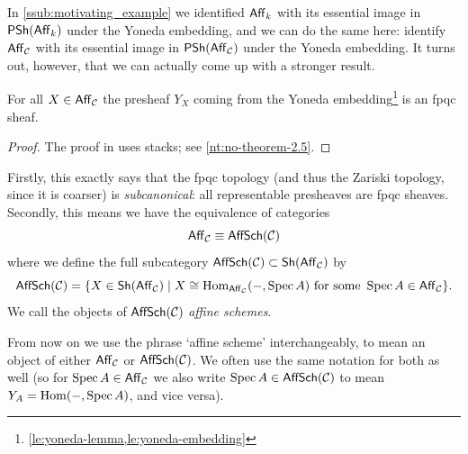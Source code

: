        In \cref{ssub:motivating_example} we identified $\mathsf{Aff}_{k}$ with its essential image in $\mathsf{PSh}(\mathsf{Aff}_{k})$ under the Yoneda embedding, and we can do the same here: identify $\mathsf{Aff}_{\mathcal{C}}$ with its essential image in $\mathsf{PSh}(\mathsf{Aff}_{\mathcal{C}})$ under the Yoneda embedding.
        It turns out, however, that we can actually come up with a stronger result.

        \begin{lemma}\label{le:essential-image-is-fpqc}
            For all $X\in\mathsf{Aff}_{\mathcal{C}}$ the presheaf $Y_X$ coming from the Yoneda embedding\footnote{
                \cref{le:yoneda-lemma,le:yoneda-embedding}
            } is an fpqc sheaf.
        \end{lemma}

        \begin{proof}
            The proof in \cite{Toen:2005wxa} uses stacks; see \cref{nt:no-theorem-2.5}.
        \end{proof}

        Firstly, this exactly says that the fpqc topology (and thus the Zariski topology, since it is coarser) is \emph{subcanonical}: all representable presheaves are fpqc sheaves.
        Secondly, this means we have the equivalence of categories
        \begin{equation}\label{eq:both-types-of-affine-schemes}
            \mathsf{Aff}_{\mathcal{C}}\equiv\mathsf{AffSch}(\mathcal{C}) 
        \end{equation}
        where we define the full subcategory $\mathsf{AffSch}(\mathcal{C})\subset\mathsf{Sh}(\mathsf{Aff}_{\mathcal{C}})$ by
        \begin{equation*}
            \mathsf{AffSch}(\mathcal{C})=\{X\in\mathsf{Sh}(\mathsf{Aff}_{\mathcal{C}}) \mid X\cong \operatorname{Hom}_{\mathsf{Aff}_{\mathcal{C}}}({-},\operatorname{Spec} A)\text{ for some } \operatorname{Spec} A\in\mathsf{Aff}_{\mathcal{C}}\}.
        \end{equation*}
        We call the objects of $\mathsf{AffSch}(\mathcal{C})$ \emph{affine schemes}.
        
        \begin{definition}\label{df:affine-schemes-general}
            From now on we use the phrase `affine scheme' interchangeably, to mean an object of either $\mathsf{Aff}_{\mathcal{C}}$ or $\mathsf{AffSch}(\mathcal{C})$.
            We often use the same notation for both as well (so for $\operatorname{Spec} A\in\mathsf{Aff}_{\mathcal{C}}$ we also write $\operatorname{Spec} A\in\mathsf{AffSch}(\mathcal{C})$ to mean $Y_A=\operatorname{Hom}({-},\operatorname{Spec} A)$, and vice versa).
        \end{definition}
        









    \clearpage
